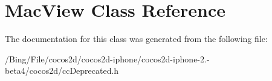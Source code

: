 \hypertarget{interface_mac_view}{\section{Mac\-View Class Reference}
\label{interface_mac_view}
}


The documentation for this class was generated from the following file\-:\begin{DoxyCompactItemize}
\item 
/\-Bing/\-File/cocos2d/cocos2d-\/iphone/cocos2d-\/iphone-\/2.-\/beta4/cocos2d/cc\-Deprecated.\-h\end{DoxyCompactItemize}
